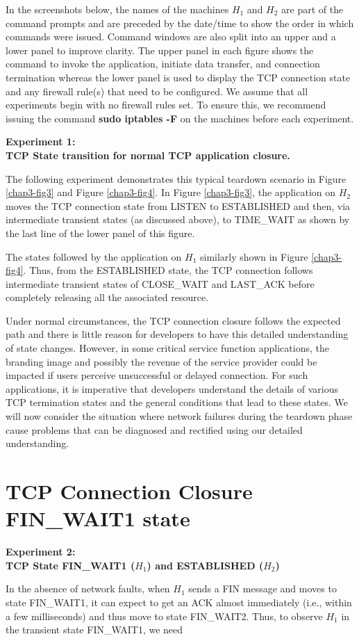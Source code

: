 \begin{multicols}{2}
In the screenshots below, the names of the machines $H_{1}$ and $H_{2}$ are part of the command prompts and are preceded by the date/time to show the order in which commands were issued. Command windows are also split into an upper and a lower panel to improve clarity. The upper panel in each figure shows the command to invoke the application, initiate data transfer, and connection termination whereas the lower panel is used to display the TCP connection state and any firewall rule(s) that need to be configured. We assume that all experiments begin with no firewall rules set. To ensure this, we recommend issuing the command \textbf{sudo iptables -F} on the machines before each experiment.

\medskip
\noindent
\textbf{Experiment 1:\\ TCP State transition for normal TCP application closure.}
\smallskip

The following experiment demonstrates this typical teardown scenario in Figure \ref{chap3-fig3} and Figure \ref{chap3-fig4}. In Figure \ref{chap3-fig3}, the application on $H_{2}$ moves the TCP connection state from LISTEN to ESTABLISHED and then, via intermediate transient states (as discussed above), to TIME\_WAIT as shown by the last line of the lower panel of this figure.

The states followed by the application on $H_{1}$ similarly shown in Figure \ref{chap3-fig4}. Thus, from the ESTABLISHED state, the TCP connection follows intermediate transient states of CLOSE\_WAIT and LAST\_ACK before completely releasing all the associated resource.

Under normal circumstances, the TCP connection closure follows the expected path and there is little reason for developers to have this detailed understanding of state changes. However, in some critical service function applications, the branding image and possibly the revenue of the service provider could be impacted if users perceive unsuccessful or delayed connection. For such applications, it is imperative that developers understand the details of various TCP termination states and the general conditions that lead to these states. We will now consider the situation where network failures during the teardown phase cause problems that can be diagnosed and rectified using our detailed understanding.

\section{TCP Connection Closure\\ FIN\_WAIT1 state}

\noindent
\textbf{Experiment 2:\\ TCP State FIN\_WAIT1 (\boldmath$H_{1}$) and ESTABLISHED ($H_{2}$)}

{\parfillskip=0pt In the absence of network faults, when $H_{1}$ sends a FIN message and moves to state FIN\_WAIT1, it can expect to get an ACK almost immediately (i.e., within a few milliseconds) and thus move to state FIN\_WAIT2. Thus, to observe $H_{1}$ in the transient state FIN\_WAIT1, we need\par}
\end{multicols}

